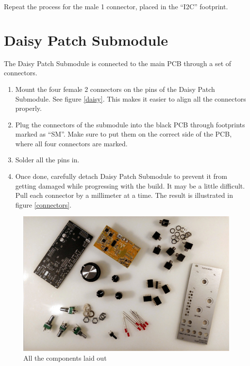 \documentclass[10pt,a4paper,twocolumn]{article}
\begin{document}
Repeat the process for the male 1 connector, placed in the ``I2C''
footprint.

\section{Daisy Patch Submodule}

The Daisy Patch Submodule is connected to the main PCB through a set of
connectors.

\begin{enumerate}
  \item Mount the four female 2 connectors on the pins of the Daisy
    Patch Submodule. See figure \ref{daisy}. This makes it easier to
    align all the connectors properly.
  \item Plug the connectors of the submodule into the black PCB through
    footprints marked as ``SM''. Make sure to put them on the correct side
    of the PCB, where all four connectors are marked.
  \item Solder all the pins in.
  \item Once done, carefully detach Daisy Patch Submodule to prevent it
    from getting damaged while progressing with the build. It may be a
    little difficult. Pull each connector by a millimeter at a time.
    The result is illustrated in figure \ref{connectors}.
\end{enumerate}

\begin{figure}[h]
  \centering
  \includegraphics[width=\linewidth]{p01.jpg}
  \caption{All the components laid out}
\end{figure}
\end{document}
